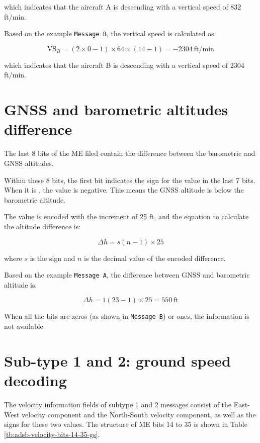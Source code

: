 which indicates that the aircraft A is descending with a vertical speed of 832 ft/min.

Based on the example \texttt{Message B}, the vertical speed is calculated as:

\begin{equation}
  \mathrm{VS}_B = (2 \times 0 - 1) \times 64 \times (14 -1) = -2304 ~\text{ft/min}
\end{equation}

which indicates that the aircraft B is descending with a vertical speed of 2304 ft/min.


\section{GNSS and barometric altitudes difference}

The last 8 bits of the ME filed contain the difference between the barometric and GNSS altitudes. 

Within these 8 bits, the first bit indicates the sign for the value in the last 7 bits. When it is \1, the value is negative. This means the GNSS altitude is below the barometric altitude.

The value is encoded with the increment of 25 ft, and the equation to calculate the altitude difference is:

\begin{equation}
  \Delta h = s (n - 1) \times 25
\end{equation}

where $s$ is the sign and $n$ is the decimal value of the encoded difference.

Based on the example \texttt{Message A}, the difference between GNSS and barometric altitude is:

\begin{equation}
  \Delta h = 1 (23 - 1) \times 25 = 550 ~\text{ft}
\end{equation}

When all the bits are zeros (as shown in \texttt{Message B}) or ones, the information is not available.


\section{Sub-type 1 and 2: ground speed decoding}

The velocity information fields of subtype 1 and 2 messages consist of the East-West velocity component and the North-South velocity component, as well as the signs for these two values. The structure of ME bits 14 to 35 is shown in Table \ref{tb:adsb-velocity-bits-14-35-gs}.


